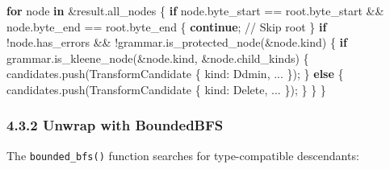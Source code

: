 \documentclass[
  letterpaper,
]{article}
\newenvironment{Shaded}{\begin{snugshade}}{\end{snugshade}}
\newcommand{\CommentTok}[1]{\textcolor[rgb]{0.37,0.37,0.37}{#1}}
\newcommand{\ControlFlowTok}[1]{\textcolor[rgb]{0.00,0.23,0.31}{\textbf{#1}}}
\newcommand{\KeywordTok}[1]{\textcolor[rgb]{0.00,0.23,0.31}{\textbf{#1}}}
\newcommand{\NormalTok}[1]{\textcolor[rgb]{0.00,0.23,0.31}{#1}}
\newcommand{\OperatorTok}[1]{\textcolor[rgb]{0.37,0.37,0.37}{#1}}
\begin{document}
\begin{Shaded}
\begin{Highlighting}[]
\ControlFlowTok{for}\NormalTok{ node }\KeywordTok{in} \OperatorTok{\&}\NormalTok{result}\OperatorTok{.}\NormalTok{all\_nodes }\OperatorTok{\{}
    \ControlFlowTok{if}\NormalTok{ node}\OperatorTok{.}\NormalTok{byte\_start }\OperatorTok{==}\NormalTok{ root}\OperatorTok{.}\NormalTok{byte\_start }\OperatorTok{\&\&}\NormalTok{ node}\OperatorTok{.}\NormalTok{byte\_end }\OperatorTok{==}\NormalTok{ root}\OperatorTok{.}\NormalTok{byte\_end }\OperatorTok{\{}
        \ControlFlowTok{continue}\OperatorTok{;} \CommentTok{// Skip root}
    \OperatorTok{\}}
    \ControlFlowTok{if} \OperatorTok{!}\NormalTok{node}\OperatorTok{.}\NormalTok{has\_errors }\OperatorTok{\&\&} \OperatorTok{!}\NormalTok{grammar}\OperatorTok{.}\NormalTok{is\_protected\_node(}\OperatorTok{\&}\NormalTok{node}\OperatorTok{.}\NormalTok{kind) }\OperatorTok{\{}
        \ControlFlowTok{if}\NormalTok{ grammar}\OperatorTok{.}\NormalTok{is\_kleene\_node(}\OperatorTok{\&}\NormalTok{node}\OperatorTok{.}\NormalTok{kind}\OperatorTok{,} \OperatorTok{\&}\NormalTok{node}\OperatorTok{.}\NormalTok{child\_kinds) }\OperatorTok{\{}
\NormalTok{            candidates}\OperatorTok{.}\NormalTok{push(TransformCandidate }\OperatorTok{\{}\NormalTok{ kind}\OperatorTok{:}\NormalTok{ Ddmin}\OperatorTok{,} \OperatorTok{...} \OperatorTok{\}}\NormalTok{)}\OperatorTok{;}
        \OperatorTok{\}} \ControlFlowTok{else} \OperatorTok{\{}
\NormalTok{            candidates}\OperatorTok{.}\NormalTok{push(TransformCandidate }\OperatorTok{\{}\NormalTok{ kind}\OperatorTok{:}\NormalTok{ Delete}\OperatorTok{,} \OperatorTok{...} \OperatorTok{\}}\NormalTok{)}\OperatorTok{;}
        \OperatorTok{\}}
    \OperatorTok{\}}
\OperatorTok{\}}
\end{Highlighting}
\end{Shaded}

\subsubsection{4.3.2 Unwrap with
BoundedBFS}\label{unwrap-with-boundedbfs}

The \texttt{bounded\_bfs()} function searches for type-compatible
descendants:
\end{document}
